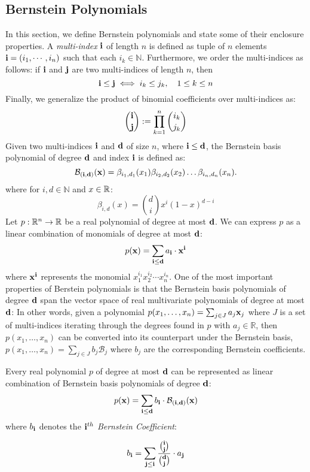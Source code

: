 \subsection{Bernstein Polynomials}
\label{sec:bernstein}
In this section, we define Bernstein polynomials and state some of their enclosure properties. A \emph{multi-index} ${\bf i}$ of length $n$ is defined as tuple of $n$ elements ${\bf i} = (i_1,\cdots, i_n)$ such that each $i_k \in \mathbb{N}$. Furthermore, we order the multi-indices as follows: if ${\bf i}$ and ${\bf j}$ are two multi-indices of length $n$, then
\[
  {\bf i} \leq {\bf j} \iff i_k \leq j_k, \quad 1 \leq  k \leq n
\]
Finally, we generalize the product of binomial coefficients over multi-indices as:
\[
  \binom{{\bf i}}{{\bf j}} := \prod_{k=1}^n \binom{i_k}{j_k}
\]
%
Given two multi-indices ${\bf i}$ and ${\bf d}$ of size $n$, where ${\bf i} \leq {\bf d}$, the Bernstein basis polynomial of degree ${\bf d}$ and index ${\bf i}$ is defined as:
\begin{equation}
\label{eq:bernstein_basis_poly}
\mathcal{B}_{({\bf i},{\bf d})}({\bf x}) = \beta_{i_1,d_1}(x_1) \beta_{i_2,d_2}(x_2)\ldots \beta_{i_n,d_n}(x_n).
\end{equation}
%
where for $i,d \in \mathbb{N}$ and $x \in {\mathbb{R}}$:
%
\begin{equation}
\beta_{i,d}(x) = \binom{d}{i}x^{i}(1-x)^{d - i}
\end{equation}
%
Let $p: {\mathbb{R}}^n \rightarrow {\mathbb{R}}$ be a real polynomial of degree at most ${\bf d}$. We can express $p$ as a linear combination of monomials of degree at most ${\bf d}$:
\[
p({\bf x}) = \sum_{{\bf i} \leq {\bf d}} a_{\bf i} \cdot {\bf x}^{\bf i}
\]
where ${\bf x}^{\bf i}$ represents the monomial $x_1^{i_1}x_2^{i_2}\cdots x_n^{i_n}$. One of the most important properties of Berstein polynomials is that the Bernstein basis polynomials of degree ${\bf d}$ span the vector space of real multivariate polynomials of degree at most ${\bf d}$:
%
In other words, given a polynomial $p(x_1,\ldots,x_n) = \sum_{j \in J} a_j {\bf x}_{j}$ where $J$ is a set of multi-indices iterating through the degrees found in $p$ with $a_j \in \mathbb{R}$, then $p(x_1,\ldots,x_n)$ can be converted into its counterpart under the Bernstein basis, $p(x_1,\ldots,x_n) = \sum_{j \in J} b_j \mathcal{B}_j $ where $b_j$ are the corresponding Bernstein coefficients.
\newpage
\begin{property}
\label{prop:bern_basis}
Every real polynomial $p$ of degree at most ${\bf d}$ can be represented as linear combination of Bernstein basis polynomials of degree ${\bf d}$:
%
\begin{equation}
  \label{eq:bernstein_coeff}
  p({\bf x}) = \sum_{{\bf i} \leq {\bf d}} b_{{\bf i}} \cdot \mathcal{B}_{({\bf i},{\bf d})}({\bf x})
\end{equation}
where $b_{\bf i}$ denotes the \emph{${\bf i}^{th}$ Bernstein Coefficient}:

\begin{equation}
b_{{\bf i}} = \sum_{{\bf j} \leq {\bf i}} \frac{\binom{{\bf i}}{{\bf j}}}{\binom{{\bf d}}{{\bf j}}}\cdot a_{{\bf j}}
\end{equation}
\end{property}

